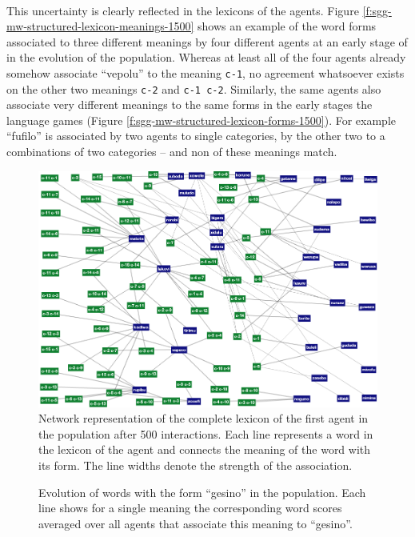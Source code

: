 ~\\


This uncertainty is clearly reflected in the lexicons of the
agents. Figure \ref{f:sgg-mw-structured-lexicon-meanings-1500} shows
an example of the word forms associated to three different meanings by
four different agents at an early stage of in the evolution of the
population. Whereas at least all of the four agents already somehow
associate ``vepolu'' to the meaning \texttt{c-1}, no agreement
whatsoever exists on the other two meanings \texttt{c-2} and
\texttt{c-1 c-2}. Similarly, the same agents also associate very
different meanings to the same forms in the early stages the language
games (Figure \ref{f:sgg-mw-structured-lexicon-forms-1500}). For
example ``fufilo'' is associated by two agents to single categories,
by the other two to a combinations of two categories -- and non of
these meanings match.

\begin{figure}[p]
  \includegraphics[width=\textwidth]{figures/sgg-mw-structured-lexicon-500}
  \caption{Network representation of the complete lexicon of the first
    agent in the population after 500 interactions. Each line
    represents a word in the lexicon of the agent and connects the
    meaning of the word with its form. The line widths denote the
    strength of the association. }
  \label{f:sgg-mw-structured-lexicon-500}
\end{figure}

\startfiguregroup


\begin{figure}[p]
  \caption{Evolution of words with the form ``gesino'' in the
    population. Each line shows for a single meaning the corresponding
    word scores averaged over all agents that associate this meaning
    to ``gesino''. }
  \label{f:sgg-mw-structured-word-meaning-scores-gesino}
\end{figure}


